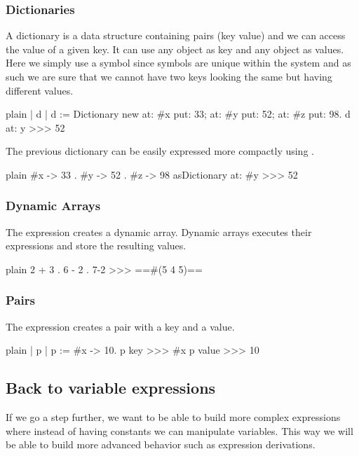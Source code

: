 \documentclass[10pt,twoside,english]{_support/latex/sbabook/sbabook}
\begin{document}
\subsubsection{Dictionaries}
A dictionary is a data structure containing pairs (key value) and we can access the value of a given key. It can use any object as key and any object as values. Here we simply use a symbol  since symbols are unique within the system and as such we are sure that we cannot have two keys looking the same but having different values. 

\begin{displaycode}{plain}
| d |
d := Dictionary new
	at: #x put: 33;
	at: #y put: 52;
	at: #z put: 98.
d at: y
>>> 52 
\end{displaycode}

The previous dictionary can be easily expressed more compactly using .

\begin{displaycode}{plain}
{#x -> 33 . #y -> 52 . #z -> 98} asDictionary at: #y
>>> 52 
\end{displaycode}
\subsubsection{Dynamic Arrays}
The expression \textcode{\{ \}} creates a dynamic array. Dynamic arrays executes their expressions and store the resulting values. 

\begin{displaycode}{plain}
{2 + 3 . 6 - 2 . 7-2 }
>>> ==#(5 4 5)==
\end{displaycode}
\subsubsection{Pairs}
The expression  creates a pair with a key and a value.

\begin{displaycode}{plain}
| p |
p := #x -> 10.
p key 
>>> #x
p value
>>> 10
\end{displaycode}
\subsection{Back to variable expressions}
If we go a step further, we want to be able to build more complex expressions where instead of having constants we can manipulate variables. This way we will be able to build more advanced behavior such as expression derivations. 
\end{document}
